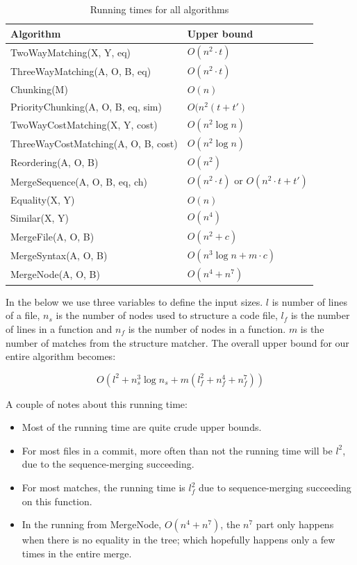 \documentclass[11pt]{article}
\begin{document}
\begin{table}
\begin{tabular}{l | l  }
\textbf{Algorithm} & \textbf{Upper bound} \\ \hline
TwoWayMatching(X, Y, eq) & $O(n^2 \cdot t)$ \\
ThreeWayMatching(A, O, B, eq) & $O(n^2 \cdot t)$ \\
Chunking(M) & $O(n)$ \\
PriorityChunking(A, O, B, eq, sim) & $O(n^2(t + t')$ \\
TwoWayCostMatching(X, Y, cost) & $O(n^2 \log n)$ \\
ThreeWayCostMatching(A, O, B, cost) & $O(n^2 \log n)$ \\
Reordering(A, O, B) & $O(n^2)$ \\

MergeSequence(A, O, B, eq, ch) & $O(n^2 \cdot t)$  or  $O(n^2 \cdot t +  t')$ \\

Equality(X, Y)  & $O(n)$ \\
Similar(X, Y) & $O(n^4)$ \\


MergeFile(A, O, B) & $O(n^2 + c)$ \\
MergeSyntax(A, O, B) & $O(n^3 \log n + m \cdot c)$ \\
MergeNode(A, O, B) & $O(n^4 + n^7)$ \\
\end{tabular}
\caption{Running times for all algorithms}
\label{RunningTimeTable}
\end{table}

In the below we use three variables to define the input sizes. $l$ is number of lines of a file, $n_s$ is the number of nodes used to structure a code file, $l_f$ is the number of lines in a function and $n_f$ is the number of nodes in a function. $m$ is the number of matches from the structure matcher. The overall upper bound for our entire algorithm becomes:

\begin{equation}
O(l^2 + n_s^3 \log n_s + m ( l_{f}^2 + n_{f}^4 + n_{f}^7)) \nonumber
\end{equation}

A couple of notes about this running time:

\begin{itemize}
	\item Most of the running time are quite crude upper bounds.
	\item For most files in a commit, more often than not the running time will be $l^2$, due to the sequence-merging succeeding.
	\item For most matches, the running time is $l_f^2$ due to sequence-merging succeeding on this function.
	\item In the running from MergeNode, $O(n^4 + n^7)$, the $n^7$ part only happens when there is no equality in the tree; which hopefully happens only a few times in the entire merge.
\end{itemize}
\end{document}
